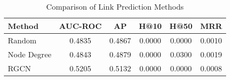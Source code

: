 \begin{table}[htbp]
\centering
\caption{Comparison of Link Prediction Methods}
\label{tab:method_comparison}
\begin{tabular}{lccccc}
\hline
Method & AUC-ROC & AP & H@10 & H@50 & MRR \\
\hline
Random & 0.4835 & 0.4867 & 0.0000 & 0.0000 & 0.0010 \\
Node Degree & 0.4843 & 0.4879 & 0.0000 & 0.0300 & 0.0019 \\
RGCN & 0.5205 & 0.5132 & 0.0000 & 0.0000 & 0.0008 \\
\hline
\end{tabular}
\end{table}